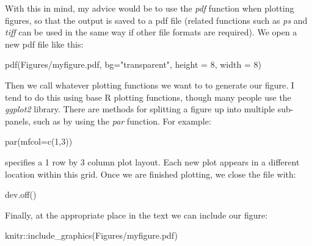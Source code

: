 \documentclass[
]{article}
\newenvironment{Shaded}{\begin{snugshade}}{\end{snugshade}}
\newcommand{\AttributeTok}[1]{\textcolor[rgb]{0.77,0.63,0.00}{#1}}
\newcommand{\DecValTok}[1]{\textcolor[rgb]{0.00,0.00,0.81}{#1}}
\newcommand{\FunctionTok}[1]{\textcolor[rgb]{0.00,0.00,0.00}{#1}}
\newcommand{\NormalTok}[1]{#1}
\newcommand{\SpecialCharTok}[1]{\textcolor[rgb]{0.00,0.00,0.00}{#1}}
\newcommand{\StringTok}[1]{\textcolor[rgb]{0.31,0.60,0.02}{#1}}
\begin{document}
With this in mind, my advice would be to use the \emph{pdf} function when plotting figures, so that the output is saved to a pdf file (related functions such as \emph{ps} and \emph{tiff} can be used in the same way if other file formats are required). We open a new pdf file like this:

\begin{Shaded}
\begin{Highlighting}[]
\FunctionTok{pdf}\NormalTok{(}\StringTok{\textquotesingle{}Figures/myfigure.pdf\textquotesingle{}}\NormalTok{, }\AttributeTok{bg=}\StringTok{"transparent"}\NormalTok{, }\AttributeTok{height =} \DecValTok{8}\NormalTok{, }\AttributeTok{width =} \DecValTok{8}\NormalTok{)}
\end{Highlighting}
\end{Shaded}

Then we call whatever plotting functions we want to to generate our figure. I tend to do this using base R plotting functions, though many people use the \emph{ggplot2} library. There are methods for splitting a figure up into multiple sub-panels, such as by using the \emph{par} function. For example:

\begin{Shaded}
\begin{Highlighting}[]
\FunctionTok{par}\NormalTok{(}\AttributeTok{mfcol=}\FunctionTok{c}\NormalTok{(}\DecValTok{1}\NormalTok{,}\DecValTok{3}\NormalTok{))}
\end{Highlighting}
\end{Shaded}

specifies a 1 row by 3 column plot layout. Each new plot appears in a different location within this grid. Once we are finished plotting, we close the file with:

\begin{Shaded}
\begin{Highlighting}[]
\FunctionTok{dev.off}\NormalTok{()}
\end{Highlighting}
\end{Shaded}

Finally, at the appropriate place in the text we can include our figure:

\begin{Shaded}
\begin{Highlighting}[]
\NormalTok{knitr}\SpecialCharTok{::}\FunctionTok{include\_graphics}\NormalTok{(}\StringTok{\textquotesingle{}Figures/myfigure.pdf\textquotesingle{}}\NormalTok{)}
\end{Highlighting}
\end{Shaded}
\end{document}
